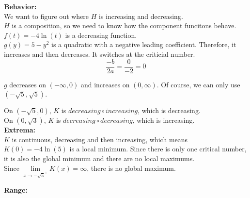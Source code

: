 \documentclass{ximera}
\begin{document}
\textbf{\textcolor{blue!55!black}{Behavior:}} \\


We want to figure out where $H$ is increasing and decreasing. \\

$H$ is a composition, so we need to know how the component funcitons behave. \\





$f(t) = -4 \ln(t)$ is a decreasing function. \\

$g(y) = 5 - y^2$ is a quadratic with a negative leading coefficient.  Therefore, it increases and then decreases.   It switches at the criticial number.\\



\[
\frac{-b}{2 a} = \frac{0}{-2} = 0
\]


$g$ decreases on $(-\infty, 0)$ and increases on $(0, \infty)$.  Of course, we can only use $(-\sqrt{5}, \sqrt{5})$.





On $(-\sqrt{5}, 0)$, $K$ is $decreasing \circ increasing$, which is decreasing. \\


On $(0, \sqrt{3})$, $K$ is $decreasing \circ decreasing$, which is increasing. \\








\textbf{\textcolor{blue!55!black}{Extrema:}} \\


$K$ is continuous, decreasing and then increasing, which means $K(0) = -4 \ln(5)$ is a local minimum. Since there is only one critical number, it is also the global minimum and there are no local maximums.\\



Since $\lim\limits_{x \to -\sqrt{5}^+} K(x) = \infty$,  there is no global maximum.












\textbf{\textcolor{blue!55!black}{Range:}} \\
\end{document}
